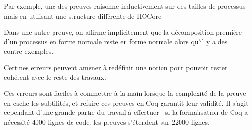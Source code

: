 \documentclass{article}
\begin{document}
Par exemple, une des preuves raisonne inductivement sur des tailles de processus mais en utilisant une structure différente de HOCore.

Dans une autre preuve, on affirme implicitement que la décomposition première d'un processus en forme normale reste en forme normale alors qu'il y a des contre-exemples.

Certines erreurs peuvent amener à redéfinir une notion pour pouvoir rester cohérent avec le reste des travaux.

Ces erreurs sont faciles à commettre à la main lorsque la complexité de la preuve en cache les subtilités, et refaire ces preuves en Coq garantit leur validité. Il s'agit cependant d'une grande partie du travail à effectuer : si la formalisation de Coq a nécessité 4000 lignes de code, les preuves s'étendent sur 22000 lignes. 
\end{document}
